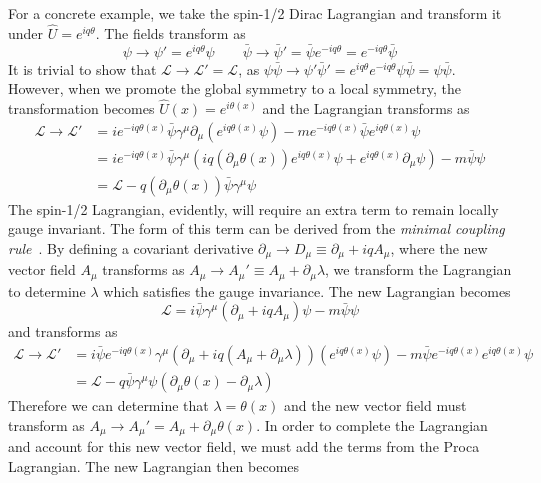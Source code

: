 For a concrete example, we take the spin-1/2 Dirac Lagrangian and transform it under $\hat{U}=e^{iq\theta}$. The fields transform as
\begin{equation}
	\psi\to\psi'=e^{iq\theta}\psi \qquad \bar{\psi}\to\bar{\psi}'= \bar{\psi}e^{-iq\theta} =e^{-iq\theta}\bar{\psi}
\end{equation}
It is trivial to show that $\mathcal{L}\to\mathcal{L}'=\mathcal{L}$, as $\psi\bar{\psi}\to\psi'\bar{\psi}'=e^{iq\theta}e^{-iq\theta}\psi\bar{\psi}=\psi\bar{\psi}$. However, when we promote the global symmetry to a local symmetry, the transformation becomes $\hat{U}(x)=e^{i\theta(x)}$ and the Lagrangian transforms as
\begin{align}
	\mathcal{L}\to\mathcal{L}'&=ie^{-iq\theta(x)}\bar{\psi}\gamma^\mu\partial_\mu(e^{iq\theta(x)}\psi)-me^{-iq\theta(x)}\bar{\psi}e^{iq\theta(x)}\psi\\
	&=ie^{-iq\theta(x)}\bar{\psi}\gamma^\mu\left(iq(\partial_\mu\theta(x))e^{iq\theta(x)}\psi+e^{iq\theta(x)}\partial_\mu\psi\right)-m\bar{\psi}\psi\\
	&=\mathcal{L}-q(\partial_\mu\theta(x))\bar{\psi}\gamma^\mu\psi
\end{align}
The spin-1/2 Lagrangian, evidently, will require an extra term to remain locally gauge invariant. The form of this term can be derived from the \textit{minimal coupling rule}~\cite{griffiths_gauge}. By defining a covariant derivative $\partial_\mu\to D_\mu\equiv\partial_\mu+iqA_\mu$, where the new vector field $A_\mu$ transforms as $A_\mu\to A_\mu'\equiv A_\mu+\partial_\mu\lambda$, we transform the Lagrangian to determine $\lambda$ which satisfies the gauge invariance. The new Lagrangian becomes \begin{equation}
	\mathcal{L}=i\bar{\psi}\gamma^\mu\left(\partial_\mu+iqA_\mu\right)\psi-m\bar{\psi}\psi
\end{equation}
and transforms as
\begin{align}
	\mathcal{L}\to\mathcal{L}'&=i\bar{\psi}e^{-iq\theta(x)}\gamma^\mu\left(\partial_\mu+iq(A_\mu+\partial_\mu\lambda)\right)(e^{iq\theta(x)}\psi)-m\bar{\psi}e^{-iq\theta(x)}e^{iq\theta(x)}\psi\\
	&=\mathcal{L}-q\bar{\psi}\gamma^\mu\psi\left(\partial_\mu\theta(x)-\partial_\mu\lambda\right)
\end{align}
Therefore we can determine that $\lambda=\theta(x)$ and the new vector field must transform as $A_\mu\to A_\mu'=A_\mu+\partial_\mu\theta(x)$. In order to complete the Lagrangian and account for this new vector field, we must add the terms from the Proca Lagrangian. The new Lagrangian then becomes
